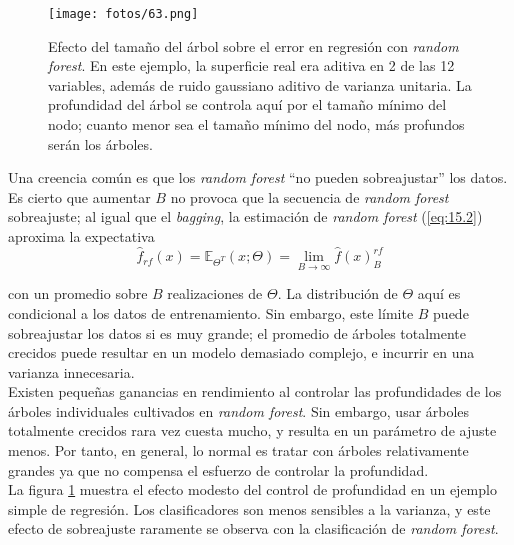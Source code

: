 \begin{figure}[H]
\centering
\texttt{[image: fotos/63.png]}
\caption{Efecto del tamaño del árbol sobre el error en regresión con \textit{random forest}. En este ejemplo, la superficie real era aditiva en 2 de las 12 variables, además de ruido gaussiano aditivo de varianza unitaria. La profundidad del árbol se controla aquí por el tamaño mínimo del nodo; cuanto menor sea el tamaño mínimo del nodo, más profundos serán los árboles.}
\label{fig:20.18}
\end{figure}

Una creencia común es que los \textit{random forest} ``no pueden sobreajustar'' los datos. Es cierto que aumentar $B$ no provoca que la secuencia de \textit{random forest} sobreajuste; al igual que el \textit{bagging}, la estimación de \textit{random forest} (\ref{eq:15.2}) aproxima la expectativa
\begin{equation}
\hat{f}_{rf} (x) = \mathbb{E}_{\Theta^T} (x; \Theta) = \lim_{B \to \infty} \hat{f} (x)_B^{rf}
\end{equation}

\noindent con un promedio sobre $B$ realizaciones de $\Theta$. La distribución de $\Theta$ aquí es condicional a los datos de entrenamiento. Sin embargo, este límite $B$ puede sobreajustar los datos si es muy grande; el promedio de árboles totalmente crecidos puede resultar en un modelo demasiado complejo, e
incurrir en una varianza innecesaria. \\

Existen pequeñas ganancias en rendimiento al controlar las profundidades de los árboles individuales cultivados en \textit{random forest}. Sin embargo, usar árboles totalmente crecidos rara vez cuesta mucho, y resulta en un parámetro de ajuste menos. Por tanto, en general, lo normal es tratar con árboles relativamente grandes ya que no compensa el esfuerzo de controlar la profundidad. \\

La figura \ref{fig:20.18} muestra el efecto modesto del control de profundidad en un ejemplo simple de regresión. Los clasificadores son menos sensibles a la varianza, y este efecto de sobreajuste raramente se observa con la clasificación de \textit{random forest}. 